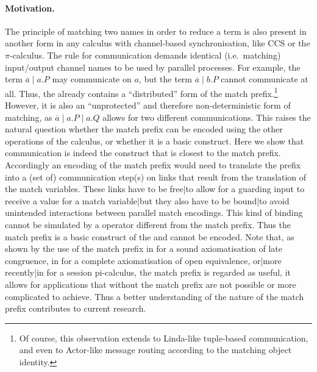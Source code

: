 \documentclass[final,copyright,creativecommons]{eptcs}
\begin{document}
\paragraph{Motivation.} The principle of matching two names in order to reduce a term is also present in another form in any calculus with channel-based synchronisation, like CCS or the $\pi$-calculus.
The rule for communication demands identical (i.e.~matching) input/output channel names to be used by parallel processes. For example, the term $ \overline{a} \mid a.P $ may communicate on $ a $, but the term $ \overline{a} \mid b.P $ cannot communicate at all. Thus, the \piCal already contains a ``distributed'' form of the match prefix.\footnote{Of course, this observation extends to Linda-like tuple-based communication, and even to Actor-like message routing according to the matching object identity.} However, it is also an ``unprotected'' and therefore non-deterministic form of matching, as $ \overline{a} \mid a.P \mid a.Q $ allows for two different communications. This raises the natural question whether the match prefix can be encoded using the other operations of the calculus, or whether it is a basic construct.
Here we show that communication is indeed the \piCal construct that is closest to the match prefix.
Accordingly an encoding of the match prefix would need to translate the prefix into a (set of) communication step(s) on links that result from the translation of the match variables. These links have to be free|to allow for a guarding input to receive a value for a match variable|but they also have to be bound|to avoid unintended interactions between parallel match encodings. This kind of binding cannot be simulated by a \piCal operator different from the match prefix.
Thus the match prefix is a basic construct of the \piCal and cannot be encoded.
Note that, as shown by the use of the match prefix \eg in \cite{milnerParrowWalker92} for a sound axiomatisation of late congruence, in \cite{sangiorgi96} for a complete axiomatisation of open equivalence, {or}|{more recently}|{in} \cite{giunti13} for a session pi-calculus, the match prefix is regarded as useful, \ie it allows for applications that without the match prefix are not possible or more complicated to achieve.
Thus a better understanding of the nature of the match prefix contributes to current research.
\end{document}
